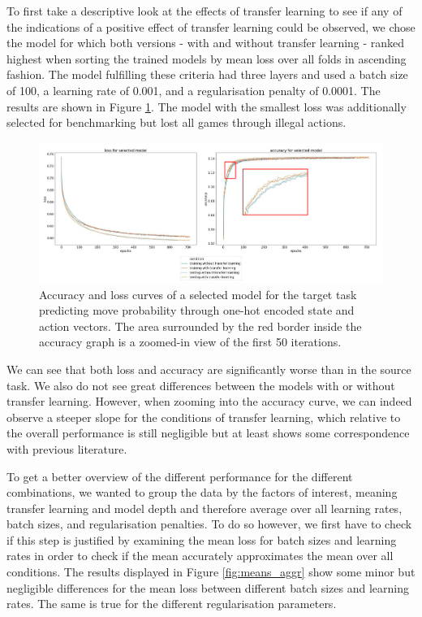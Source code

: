 \documentclass[12pt,a4paper]{article}
\begin{document}
To first take a descriptive look at the effects of transfer learning to see if any of the indications of a positive effect of transfer learning could be observed, we chose the model for which both versions - with and without transfer learning - ranked highest when sorting the trained models by mean loss over all folds in ascending fashion. The model fulfilling these criteria had three layers and used a batch size of 100, a learning rate of 0.001, and a regularisation penalty of 0.0001. The results are shown in Figure \ref{fig:trnsfr_both}. The model with the smallest loss was additionally selected for benchmarking but lost all games through illegal actions.

\begin{figure}
  \includegraphics[width=15cm]{img/trsnfr_both.jpg}
  \centering 
  \caption{Accuracy and loss curves of a selected model for the target task predicting move probability through one-hot encoded state and action vectors. The area surrounded by the red border inside the accuracy graph is a zoomed-in view of the first 50 iterations.
}
  \label{fig:trnsfr_both}
\end{figure}

We can see that both loss and accuracy are significantly worse than in the source task. We also do not see great differences between the models with or without transfer learning. However, when zooming into the accuracy curve, we can indeed observe a steeper slope for the conditions of transfer learning, which relative to the overall performance is still negligible but at least shows some correspondence with previous literature.

To get a better overview of the different performance for the different combinations, we wanted to group the data by the factors of interest, meaning transfer learning and model depth and therefore average over all learning rates, batch sizes, and regularisation penalties. To do so however, we first have to check if this step is justified by examining the mean loss for batch sizes and learning rates in order to check if the mean accurately approximates the mean over all conditions. The results displayed in Figure \ref{fig:means_aggr} show some minor but negligible differences for the mean loss between different batch sizes and learning rates. The same is true for the different regularisation parameters.
\end{document}
